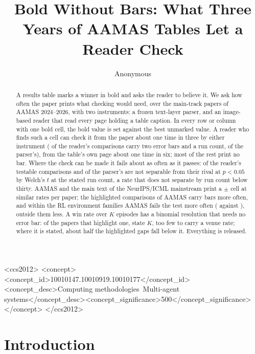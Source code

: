 \documentclass[sigconf,anonymous]{aamas}
\title{Bold Without Bars: What Three Years of AAMAS Tables Let a Reader Check}
\author{Anonymous}
\affiliation{\institution{Anonymous}\city{}\country{}}
\begin{document}
\begin{abstract}
A results table marks a winner in bold and asks the reader to believe it.
We ask how often the paper prints what checking would need, over the
\nAPapers{} main-track papers of AAMAS 2024--2026, with two instruments: a
frozen text-layer parser, and an image-based reader that read every page
holding a table caption. In every row or column with one bold cell, the
bold value is set against the best unmarked value. A reader who finds such
a cell can check it from the paper about one time in three by either
instrument (\nCzTestable{} of the reader's comparisons carry two error bars
and a run count, \nAPctTestable{} of the parser's), from the table's own
page about one time in six; most of the rest print no bar. Where the
check can be made it fails about as often as it passes: \nCzReaderFailPct{}
of the reader's testable comparisons and \nAPctFail{} of the parser's are
not separable from their rival at $p < 0.05$ by Welch's $t$ at the stated
run count, a rate that does not separate by run count below thirty. AAMAS
and the main text of the NeurIPS/ICML mainstream print a $\pm$ cell at
similar rates per paper; the highlighted comparisons of AAMAS carry bars
more often, and within the RL environment families AAMAS fails the test
more often (\nFmAamasRlFail{} against \nFmMlRlFail{}), outside them less.
A win rate over $K$ episodes has a binomial resolution that needs no error
bar: of the \nPtwoRatePapers{} papers that highlight one,
\nPtwoRatePapersWithK{} state $K$, too few to carry a venue rate; where it
is stated, about half the highlighted gaps fall below it. Everything is
released.
\end{abstract}

\begin{CCSXML}
<ccs2012>
<concept><concept_id>10010147.10010919.10010177</concept_id><concept_desc>Computing methodologies~Multi-agent systems</concept_desc><concept_significance>500</concept_significance></concept>
</ccs2012>
\end{CCSXML}

\maketitle

\section{Introduction}
\label{sec:intro}
\end{document}
